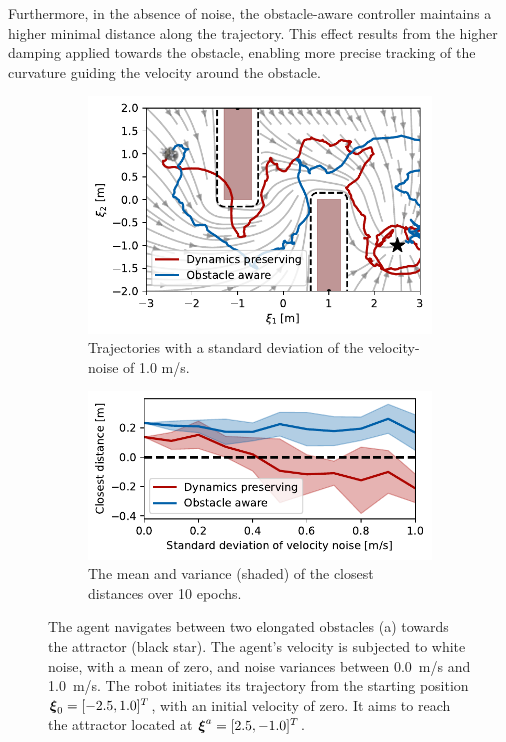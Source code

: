 Furthermore, in the absence of noise, the obstacle-aware controller maintains a higher minimal distance along the trajectory. This effect results from the higher damping applied towards the obstacle, enabling more precise tracking of the curvature guiding the velocity around the obstacle.

\begin{figure}
    \centering
    \begin{subfigure}{\columnwidth}
      \centerline{\includegraphics[width=\textwidth]{figures/trajectory_velocity_noise}}
      \caption{Trajectories with a standard deviation of the velocity-noise of 1.0 m/s.}
      \label{fig:trajectory_velocity_noise}
    \end{subfigure}
    \begin{subfigure}{\columnwidth}
    \includegraphics[width=\textwidth]{figures/comparison_velocity_noise}
      \caption{The mean and variance (shaded) of the closest distances over 10 epochs.}
      \label{fig:comparison_velocity_noise}
    \end{subfigure}
	\caption{The agent navigates between two elongated obstacles (a) towards the attractor (black star). The agent's velocity is subjected to white noise, with a mean of zero, and noise variances between \qty{0.0}{m/s} and \qty{1.0}{m/s}. The robot initiates its trajectory from the starting position $\boldsymbol{\xi}_0 = [-2.5, 1.0]^T$, with an initial velocity of zero. It aims to reach the attractor located at $\boldsymbol{\xi}^a = [2.5, -1.0]^T$.}
\label{fig:velocity_noise}
\end{figure}

